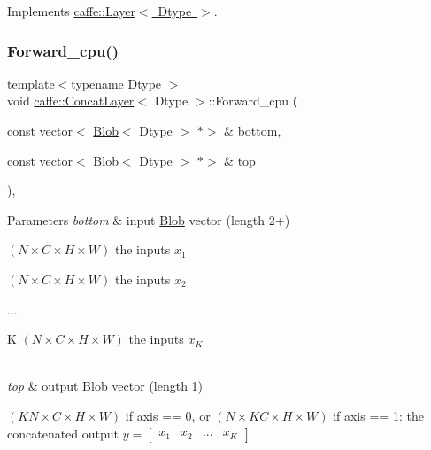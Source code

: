 Implements \mbox{\hyperlink{classcaffe_1_1_layer_a576ac6a60b1e99fe383831f52a6cea77}{caffe\+::\+Layer$<$ Dtype $>$}}.

\mbox{\label{classcaffe_1_1_concat_layer_a619c378faa120012f06bfc1065b89ae2}} 
\subsubsection{\texorpdfstring{Forward\+\_\+cpu()}{Forward\_cpu()}\hspace{0.1cm}{\footnotesize\ttfamily [2/2]}}
{\footnotesize\ttfamily template$<$typename Dtype $>$ \\
void \mbox{\hyperlink{classcaffe_1_1_concat_layer}{caffe\+::\+Concat\+Layer}}$<$ Dtype $>$\+::Forward\+\_\+cpu (\begin{DoxyParamCaption}\item[{const vector$<$ \mbox{\hyperlink{classcaffe_1_1_blob}{Blob}}$<$ Dtype $>$ $\ast$$>$ \&}]{bottom,  }\item[{const vector$<$ \mbox{\hyperlink{classcaffe_1_1_blob}{Blob}}$<$ Dtype $>$ $\ast$$>$ \&}]{top }\end{DoxyParamCaption})\hspace{0.3cm}{\ttfamily [protected]}, {\ttfamily [virtual]}}


\begin{DoxyParams}{Parameters}
{\em bottom} & input \mbox{\hyperlink{classcaffe_1_1_blob}{Blob}} vector (length 2+)
\begin{DoxyEnumerate}
\item $ (N \times C \times H \times W) $ the inputs $ x_1 $
\item $ (N \times C \times H \times W) $ the inputs $ x_2 $
\item ...
\end{DoxyEnumerate}
\begin{DoxyItemize}
\item K $ (N \times C \times H \times W) $ the inputs $ x_K $ 
\end{DoxyItemize}\\
\hline
{\em top} & output \mbox{\hyperlink{classcaffe_1_1_blob}{Blob}} vector (length 1)
\begin{DoxyEnumerate}
\item $ (KN \times C \times H \times W) $ if axis == 0, or $ (N \times KC \times H \times W) $ if axis == 1\+: the concatenated output $ y = [\begin{array}{cccc} x_1 & x_2 & ... & x_K \end{array}] $ 
\end{DoxyEnumerate}\\
\hline
\end{DoxyParams}


